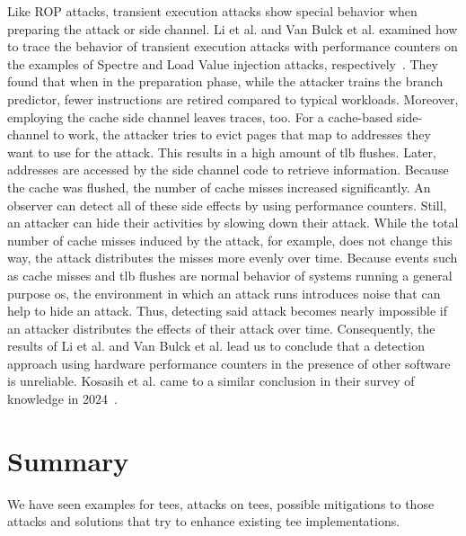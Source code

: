 Like ROP attacks, transient execution attacks show special behavior when
preparing the attack or side channel. Li et al. and Van Bulck et al. examined
how to trace the behavior of transient execution attacks with performance
counters on the examples of Spectre and Load Value injection attacks,
respectively~\cite{li_detecting_2021, van_bulck_lvi_2020}. They found that when
in the preparation phase, while the attacker trains the branch predictor, fewer
instructions are retired compared to typical workloads. Moreover, employing the
cache side channel leaves traces, too. For a cache-based side-channel to work,
the attacker tries to evict pages that map to addresses they want to use for the
attack. This results in a high amount of \gls{tlb} flushes. Later, addresses are
accessed by the side channel code to retrieve information. Because the cache was
flushed, the number of cache misses increased significantly. An observer can
detect all of these side effects by using performance counters. Still, an
attacker can hide their activities by slowing down their attack. While the total
number of cache misses induced by the attack, for example, does not change this
way, the attack distributes the misses more evenly over time. Because events
such as cache misses and \gls{tlb} flushes are normal behavior of systems
running a general purpose \gls{os}, the environment in which an attack runs
introduces noise that can help to hide an attack. Thus, detecting said attack
becomes nearly impossible if an attacker distributes the effects of their attack
over time. Consequently, the results of Li et al. and Van Bulck et al. lead us
to conclude that a detection approach using hardware performance counters in the
presence of other software is unreliable. Kosasih et al. came to a similar
conclusion in their survey of knowledge in 2024~\cite{kosasih2024sok}.

\section{Summary}
\label{sec:20:summary}
We have seen examples for \glspl{tee}, attacks on \glspl{tee}, possible
mitigations to those attacks and solutions that try to enhance existing
\gls{tee} implementations. \\

